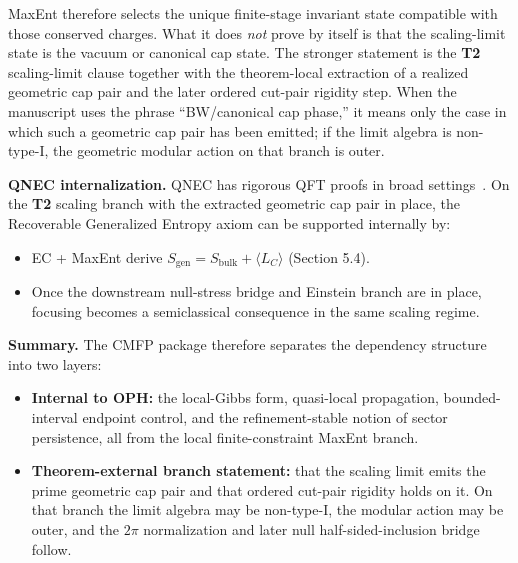MaxEnt therefore selects the unique finite-stage invariant state compatible with those conserved charges. What it does \emph{not} prove by itself is that the scaling-limit state is the vacuum or canonical cap state. The stronger statement is the \textbf{T2} scaling-limit clause together with the theorem-local extraction of a realized geometric cap pair and the later ordered cut-pair rigidity step. When the manuscript uses the phrase ``BW/canonical cap phase,'' it means only the case in which such a geometric cap pair has been emitted; if the limit algebra is non-type-I, the geometric modular action on that branch is outer.

\textbf{QNEC internalization.} QNEC has rigorous QFT proofs in broad settings~\cite{bousso16}. On the \textbf{T2} scaling branch with the extracted geometric cap pair in place, the Recoverable Generalized Entropy axiom can be supported internally by:
\begin{itemize}
\item
EC + MaxEnt derive \(S_{\mathrm{gen}}=S_{\mathrm{bulk}}+\langle L_C\rangle\) (Section 5.4).
\item
Once the downstream null-stress bridge and Einstein branch are in place, focusing becomes a semiclassical consequence in the same scaling regime.
\end{itemize}

\textbf{Summary.} The CMFP package therefore separates the dependency structure into two layers:
\begin{itemize}
\item
\textbf{Internal to OPH:} the local-Gibbs form, quasi-local propagation, bounded-interval endpoint control, and the refinement-stable notion of sector persistence, all from the local finite-constraint MaxEnt branch.
\item
\textbf{Theorem-external branch statement:} that the scaling limit emits the prime geometric cap pair and that ordered cut-pair rigidity holds on it. On that branch the limit algebra may be non-type-I, the modular action may be outer, and the \(2\pi\) normalization and later null half-sided-inclusion bridge follow.
\end{itemize}

